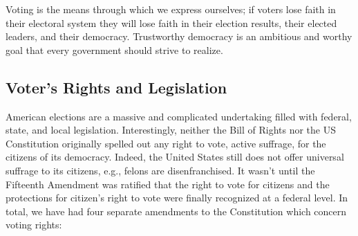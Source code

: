 Voting is the means through which we express ourselves; if voters lose faith in
their electoral system they will lose faith in their election results, their
elected leaders, and their democracy. Trustworthy democracy is an ambitious and
worthy goal that every government should strive to realize.


\subsection{Voter's Rights and Legislation}
American elections are a massive and complicated undertaking filled with
federal, state, and local legislation. Interestingly, neither the Bill of Rights
nor the US Constitution originally spelled out any right to vote, active
suffrage, for the citizens of its democracy. Indeed, the United States still
does not offer universal suffrage to its citizens, e.g., felons are
disenfranchised. It wasn't until the Fifteenth Amendment was ratified that the
right to vote for citizens and the protections for citizen's right to vote were
finally recognized at a federal level. In total, we have had four separate
amendments to the Constitution which concern voting rights:


